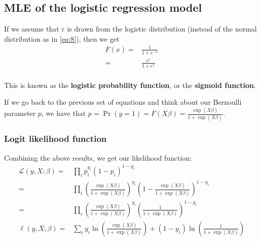 \documentclass[12pt,english]{article}
\begin{document}
\subsection{MLE of the logistic regression model}
If we assume that $\varepsilon$ is drawn from the logistic distribution (instead of the normal distribution as in \eqref{eq:8}), then we get
\begin{align*}
    F\left(x\right) =& \frac{1}{1+e^{-x}} \\
                    =& \frac{e^{x}}{1+e^{x}} \\
\end{align*}

This is known as the \textbf{logistic probability function}, or the \textbf{sigmoid function}.

If we go back to the previous set of equations and think about our Bernoulli parameter $p$, we have that $p=\Pr\left(y=1\right)=F\left(X\beta\right)=\frac{\exp\left(X\beta\right)}{1+\exp\left(X\beta\right)}$.

\subsubsection{Logit likelihood function}
Combining the above results, we get our likelihood function:
\begin{align}
    \label{eq:logit}
    \mathcal{L}\left(y,X;\beta\right) =& \prod_{i}p_{i}^{y_{i}}\left(1-p_{i}\right)^{1-y_{i}} \nonumber \\
                                      =& \prod_{i}\left(\frac{\exp\left(X\beta\right)}{1+\exp\left(X\beta\right)}\right)^{y_{i}}\left(1-\frac{\exp\left(X\beta\right)}{1+\exp\left(X\beta\right)}\right)^{1-y_{i}} \nonumber \\
                                      =& \prod_{i}\left(\frac{\exp\left(X\beta\right)}{1+\exp\left(X\beta\right)}\right)^{y_{i}}\left(\frac{1}{1+\exp\left(X\beta\right)}\right)^{1-y_{i}} \nonumber \\
    \ell\left(y,X;\beta\right) =& \sum_{i}y_{i}\ln\left(\frac{\exp\left(X\beta\right)}{1+\exp\left(X\beta\right)}\right)+\left(1-y_{i}\right)\ln\left(\frac{1}{1+\exp\left(X\beta\right)}\right) 
\end{align}
\end{document}
